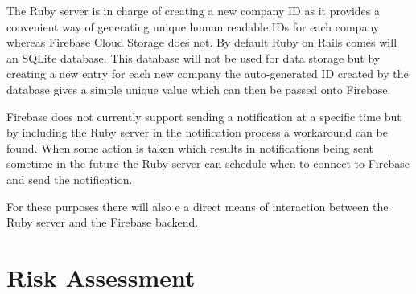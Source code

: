 The Ruby server is in charge of creating a new company ID as it provides a convenient way of generating unique human readable IDs for each company whereas Firebase Cloud Storage does not. By default Ruby on Rails comes will an SQLite database. This database will not be used for data storage but by creating a new entry for each new company the auto-generated ID created by the database gives a simple unique value which can then be passed onto Firebase.

Firebase does not currently support sending a notification at a specific time but by including the Ruby server in the notification process a workaround can be found. When some action is taken which results in notifications being sent sometime in the future the Ruby server can schedule when to connect to Firebase and send the notification.

For these purposes there will also e a direct means of interaction between the Ruby server and the Firebase backend.

\section{Risk Assessment}
\label{section:risks}




